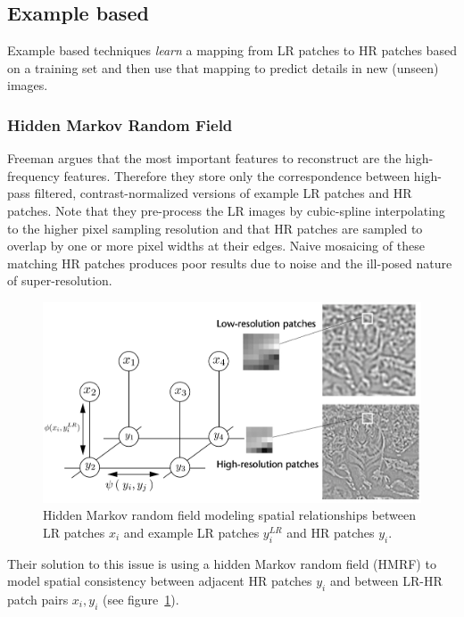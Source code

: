 \subsection{Example based}\label{subsec:example-based}

Example based techniques \textit{learn} a mapping from
LR patches to HR patches based on a training set and then use that mapping to predict details in new (unseen) images.

\subsubsection{Hidden Markov Random Field}

Freeman \etal\cite{freeman2002example} argues that the most important features to reconstruct are the high-frequency features.
%
Therefore they store only the correspondence between high-pass filtered, contrast-normalized versions of example LR patches and HR patches.
%
Note that they pre-process the LR images by cubic-spline interpolating to the higher pixel sampling resolution and that HR patches are sampled to overlap by one or more pixel widths at their edges.
%
Naive mosaicing of these matching HR patches produces poor results due to noise and the ill-posed nature of super-resolution.
%
\begin{figure}
    \centering
    \includegraphics[width=\linewidth,keepaspectratio]{figures/classical/mrf.png}
    \caption{Hidden Markov random field modeling spatial relationships between LR patches \(x_i\) and example LR patches \(y_i^{LR}\) and HR patches \(y_i\)\cite{freeman2002example}.}
    \label{fig:mrf}
\end{figure}
Their solution to this issue is using a hidden Markov random field (HMRF) to model spatial consistency between adjacent HR patches \(y_i\) and between LR-HR patch pairs \(x_i, y_i\) (see figure~\ref{fig:mrf}).
